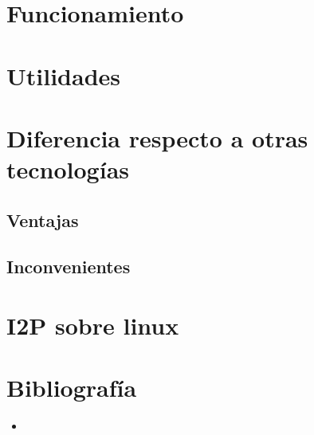 \documentclass[12]{article}
\begin{document}
\section{Funcionamiento}
\section{Utilidades}
\section{Diferencia respecto a otras tecnologías}
\subsection{Ventajas}
\subsection{Inconvenientes}
\section{I2P sobre linux}
\section{Bibliografía}
\begin{itemize}
    \item %
\end{itemize}
\end{document}
